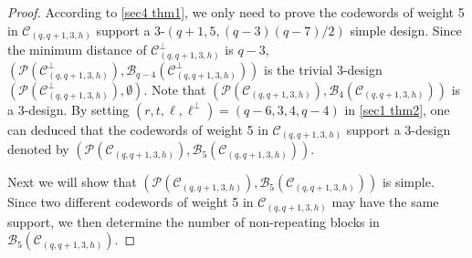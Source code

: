 \documentclass[sn-mathphys-num]{sn-jnl}%
\theoremstyle{thmstyleone}%
\theoremstyle{thmstyletwo}%
\theoremstyle{thmstylethree}%
\begin{document}
\begin{proof}
	According to \cref{sec4 thm1}, we only need to prove the codewords of weight 5 in $\mathcal{C}_{(q,q+1,3,h)}$ support a $3$-$(q+1,5,(q-3)(q-7)/2)$ simple design. Since the minimum distance of $\mathcal{C}^\perp_{(q,q+1,3,h)}$ is $q-3$, $(\mathcal{P}(\mathcal{C}^\perp_{(q,q+1,3,h)}),\mathcal{B}_{q-4}(\mathcal{C}^\perp_{(q,q+1,3,h)}))$ is the trivial 3-design $(\mathcal{P}(\mathcal{C}^\perp_{(q,q+1,3,h)}),\emptyset)$. Note that $(\mathcal{P}(\mathcal{C}_{(q,q+1,3,h)}),\mathcal{B}_4(\mathcal{C}_{(q,q+1,3,h)}))$  is a 3-design. By setting $(r,t,\ell,\ell^\perp)=(q-6,3,4,q-4)$ in \cref{sec1 thm2}, one can deduced that the codewords of weight 5 in $\mathcal{C}_{(q,q+1,3,h)}$ support a $3$-design denoted by $(\mathcal{P}(\mathcal{C}_{(q,q+1,3,h)}),\mathcal{B}_5(\mathcal{C}_{(q,q+1,3,h)}))$. 
	
	Next we will show that $(\mathcal{P}(\mathcal{C}_{(q,q+1,3,h)}),\mathcal{B}_5(\mathcal{C}_{(q,q+1,3,h)}))$ is simple. Since two different codewords of weight 5 in $\mathcal{C}_{(q,q+1,3,h)}$ may have the same support, we then determine the number of non-repeating blocks in $\mathcal{B}_5(\mathcal{C}_{(q,q+1,3,h)})$.
	

\end{proof}
\end{document}
